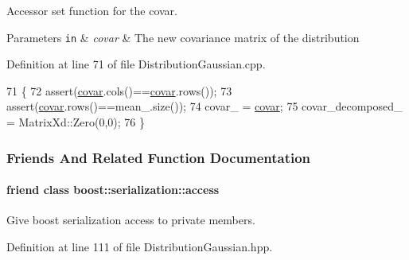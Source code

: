 Accessor set function for the covar. 


\begin{DoxyParams}[1]{Parameters}
\mbox{\tt in}  & {\em covar} & The new covariance matrix of the distribution \\
\hline
\end{DoxyParams}


Definition at line 71 of file Distribution\+Gaussian.\+cpp.


\begin{DoxyCode}
71                                                           \{ 
72   assert(\hyperlink{classDmpBbo_1_1DistributionGaussian_a5d2adde253815df42d471a876173868c}{covar}.cols()==\hyperlink{classDmpBbo_1_1DistributionGaussian_a5d2adde253815df42d471a876173868c}{covar}.rows());
73   assert(\hyperlink{classDmpBbo_1_1DistributionGaussian_a5d2adde253815df42d471a876173868c}{covar}.rows()==mean\_.size());
74   covar\_ = \hyperlink{classDmpBbo_1_1DistributionGaussian_a5d2adde253815df42d471a876173868c}{covar};
75   covar\_decomposed\_ = MatrixXd::Zero(0,0);
76 \}
\end{DoxyCode}


\subsubsection{Friends And Related Function Documentation}
\hypertarget{classDmpBbo_1_1DistributionGaussian_ac98d07dd8f7b70e16ccb9a01abf56b9c}{
\paragraph[{boost\+::serialization\+::access}]{\setlength{\rightskip}{0pt plus 5cm}friend class boost\+::serialization\+::access\hspace{0.3cm}{\ttfamily [friend]}}}\label{classDmpBbo_1_1DistributionGaussian_ac98d07dd8f7b70e16ccb9a01abf56b9c}


Give boost serialization access to private members. 



Definition at line 111 of file Distribution\+Gaussian.\+hpp.

